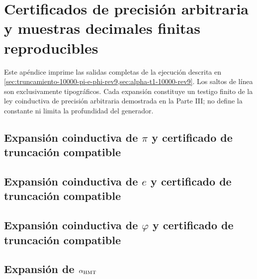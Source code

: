 \chapter{Certificados de precisión arbitraria y muestras decimales finitas reproducibles}
\label{app:desarrollos-10000-rev9}

Este apéndice imprime las salidas completas de la ejecución descrita en
\cref{sec:truncamiento-10000-pi-e-phi-rev9,sec:alpha-t1-10000-rev9}. Los
saltos de línea son exclusivamente tipográficos. Cada expansión constituye
un testigo finito de la ley coinductiva de precisión arbitraria demostrada en
la Parte III; no define la constante ni limita la profundidad del generador.

\begingroup
\lstset{basicstyle=\ttfamily\tiny,breaklines=true,breakatwhitespace=false,
  frame=single,columns=fullflexible,keepspaces=true,numbers=none}

\section{Expansión coinductiva de \(\pi\) y certificado de truncación compatible}


\section{Expansión coinductiva de \(e\) y certificado de truncación compatible}


\section{Expansión coinductiva de \(\varphi\) y certificado de truncación compatible}


\section{Expansión de \texorpdfstring{\(\alpha_{\rm HMT}\)}{alpha HMT}}

\endgroup
